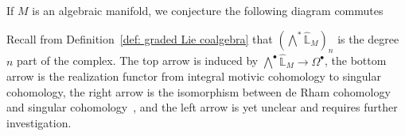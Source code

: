 \begin{conjecture}\label{conj: motivic cohomology and singular cohomology}\cite{ZDHZ_HopfAlgebrasOfMultiplePolylogarithmsAndHolomorphicOneForms}
If $M$ is an algebraic manifold, we conjecture the following diagram commutes
\begin{center}
\end{center}
Recall from Definition~\ref{def: graded Lie coalgebra} that $(\bigwedge^*\widehat{\mathbb L}_M)_n$ is the degree $n$ part of the complex. The top arrow is induced by $\bigwedge^\bullet\widehat{\mathbb L}_M\to\Omega^\bullet$, the bottom arrow is the realization functor from integral motivic cohomology to singular cohomology, the right arrow is the isomorphism between de Rham cohomology and singular cohomology~\cite{Grothendieck_OnTheDeRhamCohomologyOfAlgebraicVarieties}, and the left arrow is yet unclear and requires further investigation.
\end{conjecture}
